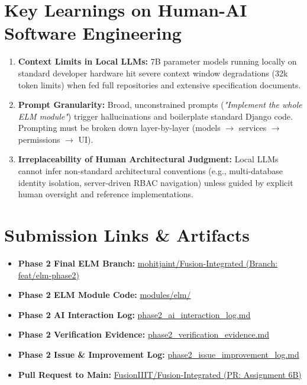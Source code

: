 \documentclass[11pt,a4paper]{article}
\begin{document}
\section{Key Learnings on Human-AI Software Engineering}
\begin{enumerate}[noitemsep,topsep=2pt]
    \item \textbf{Context Limits in Local LLMs:} 7B parameter models running locally on standard developer hardware hit severe context window degradations (32k token limits) when fed full repositories and extensive specification documents.
    \item \textbf{Prompt Granularity:} Broad, unconstrained prompts (\textit{"Implement the whole ELM module"}) trigger hallucinations and boilerplate standard Django code. Prompting must be broken down layer-by-layer (models $\rightarrow$ services $\rightarrow$ permissions $\rightarrow$ UI).
    \item \textbf{Irreplaceability of Human Architectural Judgment:} Local LLMs cannot infer non-standard architectural conventions (e.g., multi-database identity isolation, server-driven RBAC navigation) unless guided by explicit human oversight and reference implementations.
\end{enumerate}

\section{Submission Links \& Artifacts}
\begin{itemize}[noitemsep,topsep=2pt]
    \item \textbf{Phase 2 Final ELM Branch:} \href{https://github.com/mohitjaint/Fusion-Integrated/tree/feat/elm-phase2}{mohitjaint/Fusion-Integrated (Branch: feat/elm-phase2)}
    \item \textbf{Phase 2 ELM Module Code:} \href{https://github.com/mohitjaint/Fusion-Integrated/tree/feat/elm-phase2/modules/elm}{modules/elm/}
    \item \textbf{Phase 2 AI Interaction Log:} \href{https://github.com/mohitjaint/Fusion-Integrated/blob/feat/elm-phase2/evaluation\_evidence/phase2\_ai\_interaction\_log.md}{phase2\_ai\_interaction\_log.md}
    \item \textbf{Phase 2 Verification Evidence:} \href{https://github.com/mohitjaint/Fusion-Integrated/blob/feat/elm-phase2/evaluation\_evidence/phase2\_verification\_evidence.md}{phase2\_verification\_evidence.md}
    \item \textbf{Phase 2 Issue \& Improvement Log:} \href{https://github.com/mohitjaint/Fusion-Integrated/blob/feat/elm-phase2/evaluation\_evidence/phase2\_issue\_improvement\_log.md}{phase2\_issue\_improvement\_log.md}
    \item \textbf{Pull Request to Main:} \href{https://github.com/FusionIIIT/Fusion-Integrated/pulls}{FusionIIIT/Fusion-Integrated (PR: Assignment 6B)}
\end{itemize}
\end{document}
